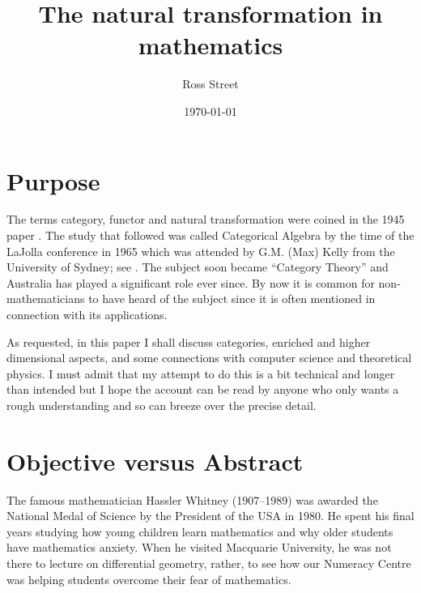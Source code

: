 \documentclass[a4paper,12pt]{article}
\theoremstyle{step}
\begin{document}
\author{Ross Street}

\title{The natural transformation in mathematics}
\date{\today}
\maketitle

\section*{Purpose}

The terms category, functor and natural transformation were coined in the 1945 paper 
\cite{EilMac}. The study that followed was called Categorical Algebra by the time of the
LaJolla conference in 1965 which was attended by G.M. (Max) Kelly from the University of Sydney;
see \cite{EilKel1966}. The subject soon became ``Category Theory'' and Australia has
played a significant role ever since. By now it is common for non-mathematicians to have
heard of the subject since it is often mentioned in connection with its applications. 
 
As requested, in this paper I shall discuss categories, enriched and higher dimensional aspects, and some connections with computer science and theoretical physics. I must admit
that my attempt to do this is a bit technical and longer than intended but I hope the account can be read by anyone who only wants a rough understanding and so can breeze over the precise detail. 

\section{Objective versus Abstract}\label{OvA}

The famous mathematician Hassler Whitney (1907--1989) was awarded the National Medal of Science by the President of the USA in 1980. He spent his final years studying how young children learn mathematics and why older students have mathematics anxiety. When he visited Macquarie University, he was not there to lecture on differential geometry, rather, to see how our Numeracy Centre was helping students overcome their fear of mathematics. 
\end{document}
